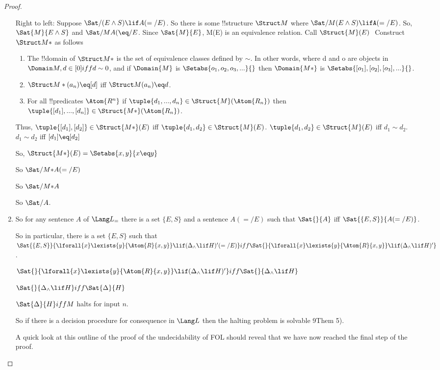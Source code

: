 \documentclass[../../include/open-logic-section]{subfiles}
\begin{document}
\begin{proof}
\begin{enumerate}
Right to left: Suppose $\Sat/{}{(E \land S) \lif A(=/E)}$.
So there is some !!{structure} $\Struct M$ where $\Sat/{M}{(E \land S)
\lifA(=/E)}$.
So, $\Sat{M}{E \land S}$ and $\Sat/{M}{A( \eq / E}$.
Since $\Sat{M}{E}$, M(E) is an equivalence relation. Call $\Struct{M} (E)
~$
Construct $\Struct M*$ as follows
\begin{enumerate}
\item The !!{domain} of $\Struct M*$ is the set of equivalence classes
defined by $\sim$. In other words, where d and o are objects in $\Domain
M,d \in [0] iff d \sim 0$, and if $\Domain{M}$ is $\Setabs{o_1, o_2, o_3,
...}{}$ then $\Domain{M*}$ is $\Setabs{[o_1], [o_2], [o_3], ...}{}$.
\item $\Struct M* (a_n) \eq [d]$ iff $\Struct M (a_n) \eq d$.
\item For all !!{predicate}s $\Atom{R^n}$ if $\tuple{d_1,...,d_n} \in
\Struct{M} (\Atom{R_n})$ then $\tuple{[d_1],...,[d_n]} \in \Struct{M*}
(\Atom{R_n})$.
\end{enumerate}
Thus, $\tuple{[d_1],[d_2]} \in \Struct{M*} (E)$ iff $\tuple{d_1,d_2} \in
\Struct{M}(E)$.
$\tuple{d_1,d_2} \in \Struct{M}(E)$ iff $d_1 \sim d_2$.
$d_1 \sim d_2$ iff $[d_1] \eq [d_2]$

So, $\Struct{M*} (E) = \Setabs{x,y}{x \eq y}$

So $\Sat/{M*}{A(=/E)}$

So $\Sat/{M*}{A}$

So $\Sat/{}{A}$.

\item So for any sentence $A$ of $\Lang L_=$ there is a set $\{ E, S \}$
and a sentence $A(=/E)$ such that $\Sat{}{A}$ iff $\Sat{\{ E, S \}
}{A(=/E)}$.

So in particular, there is a set $\{ E, S \}$ such that $\Sat{\{ E, S\}
}{\lforall{x}\lexists{y}{\Atom{R}{x,y}}\lif (\Delta_\land \lif H)'(=/E)}
iff \Sat{}{\lforall{x}\lexists{y}{\Atom{R}{x,y}}\lif (\Delta_\land \lif
H)'}$.

$\Sat{}{\lforall{x}\lexists{y}{\Atom{R}{x,y}}\lif (\Delta_\land \lif H)'}
iff \Sat{}{\Delta_\land \lif H}$

$\Sat{}{\Delta_\land \lif H} iff \Sat{\Delta}{H}$

$\Sat{\Delta}{H} iff M$ halts for input $n$.

So if there is a decision procedure for consequence in $\Lang L$ then the
halting problem is solvable 9Them 5).

A quick look at this outline of the proof of the undecidability of FOL
should reveal that we have now reached the final step of the proof.


\end{enumerate}
\end{proof}
\end{document}
